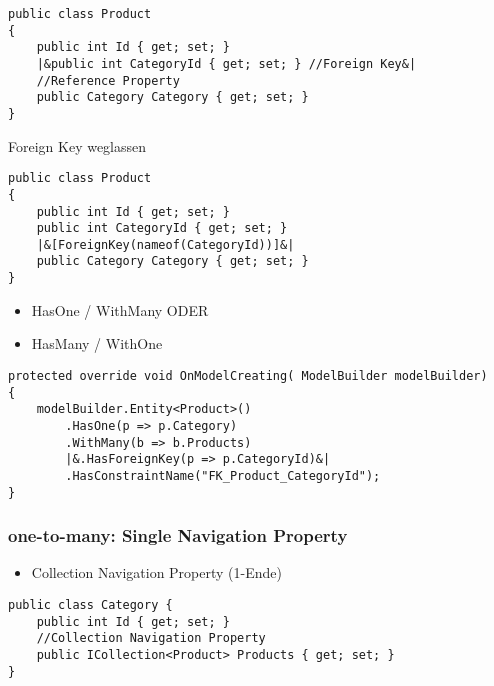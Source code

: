 \begin{multicols*}{2}
\begin{lstlisting}
public class Product
{
    public int Id { get; set; }
    |&public int CategoryId { get; set; } //Foreign Key&|
    //Reference Property
    public Category Category { get; set; } 
}
\end{lstlisting}
Foreign Key weglassen
\begin{lstlisting}
public class Product
{
    public int Id { get; set; }
    public int CategoryId { get; set; } 
    |&[ForeignKey(nameof(CategoryId))]&|
    public Category Category { get; set; }
}    
\end{lstlisting}
\begin{itemize}
    \item HasOne / WithMany ODER
    \item HasMany / WithOne
\end{itemize}
\begin{lstlisting}
protected override void OnModelCreating( ModelBuilder modelBuilder)
{
    modelBuilder.Entity<Product>()
        .HasOne(p => p.Category)
        .WithMany(b => b.Products)
        |&.HasForeignKey(p => p.CategoryId)&|
        .HasConstraintName("FK_Product_CategoryId");
}
\end{lstlisting}

\subsubsection{one-to-many: Single Navigation Property}
\begin{itemize}
    \item Collection Navigation Property (1-Ende)
\end{itemize}
\begin{lstlisting}
public class Category {
    public int Id { get; set; }
    //Collection Navigation Property
    public ICollection<Product> Products { get; set; } 
}


\end{lstlisting}
\end{multicols*}
